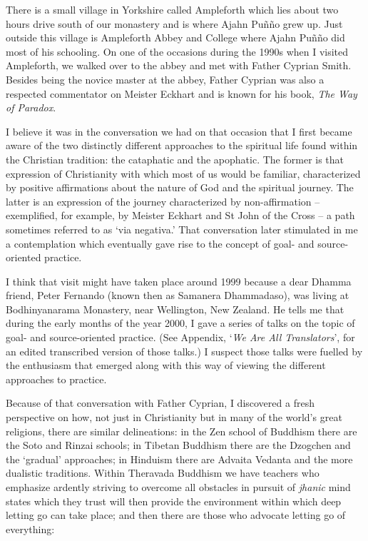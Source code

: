 There is a small village in Yorkshire called Ampleforth which lies about
two hours drive south of our monastery and is where Ajahn Puñño grew up.
Just outside this village is Ampleforth Abbey and College\cite{ampleforth}
where Ajahn Puñño did most of his
schooling. On one of the occasions during the 1990s when I visited
Ampleforth, we walked over to the abbey and met with Father Cyprian
Smith. Besides being the novice master at the abbey, Father Cyprian was
also a respected commentator on Meister Eckhart and is known for his
book, \emph{The Way of Paradox}\cite{paradox}.

I believe it was in the conversation we had on that occasion that I
first became aware of the two distinctly different approaches to the
spiritual life found within the Christian tradition: the
cataphatic and the apophatic\cite{cataphatic}. The former is that expression of
Christianity with which most of us would be familiar, characterized by
positive affirmations about the nature of God and the spiritual journey.
The latter is an expression of the journey characterized by
non-affirmation -- exemplified, for example, by Meister Eckhart and St
John of the Cross -- a path sometimes referred to as `via negativa.'
That conversation later stimulated in me a contemplation which
eventually gave rise to the concept of goal- and source-oriented
practice.

I think that visit might have taken place around 1999 because a dear
Dhamma friend, Peter Fernando (known then as Samanera Dhammadaso), was
living at Bodhinyanarama Monastery, near Wellington, New Zealand. He
tells me that during the early months of the year 2000, I gave a series
of talks on the topic of goal- and source-oriented practice. (See
Appendix, `\emph{We Are All Translators}', for an edited transcribed
version of those talks.) I suspect those talks were fuelled by the
enthusiasm that emerged along with this way of viewing the different
approaches to practice.

Because of that conversation with Father Cyprian, I discovered a fresh
perspective on how, not just in Christianity but in many of the
world's great religions, there are similar delineations: in the Zen school of Buddhism
there are the Soto and Rinzai schools; in Tibetan Buddhism there are the
Dzogchen and the `gradual' approaches; in Hinduism there are Advaita
Vedanta and the more dualistic traditions. Within Theravada Buddhism we
have teachers who emphasize ardently striving to overcome all obstacles
in pursuit of \emph{jhanic} mind states which they trust will then
provide the environment within which deep letting go can take place; and
then there are those who advocate letting go of everything:

